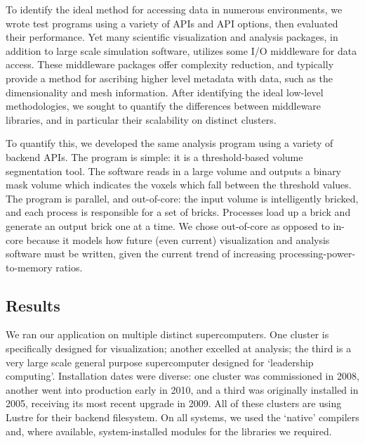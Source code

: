 To identify the ideal method for accessing data in numerous
environments, we wrote test programs using a variety of APIs and
API options, then evaluated their performance.  Yet many scientific
visualization and analysis packages, in addition to large scale
simulation software, utilizes some I/O middleware for data access.
These middleware packages offer complexity reduction, and typically
provide a method for ascribing higher level metadata with data, such as
the dimensionality and mesh information.  After identifying the ideal
low-level methodologies, we sought to quantify the differences between
middleware libraries, and in particular their scalability on distinct
clusters.

To quantify this, we developed the same analysis program using
a variety of backend APIs.  The program is simple: it is a
threshold-based volume segmentation tool.  The software reads in a
large volume and outputs a binary mask volume which indicates the
voxels which fall between the threshold values.  The program is
parallel, and out-of-core: the input volume is intelligently bricked,
and each process is responsible for a set of bricks.  Processes load
up a brick and generate an output brick one at a time.  We chose
out-of-core as opposed to in-core because it models how future (even
current) visualization and analysis software must be written, given the
current trend of increasing processing-power-to-memory ratios.


\subsection{Results}

We ran our application on multiple distinct supercomputers.  One
cluster is specifically designed for visualization; another excelled at
analysis; the third is a very large scale general purpose supercomputer
designed for `leadership computing'.  Installation dates were diverse:
one cluster was commissioned in 2008, another went into production
early in 2010, and a third was originally installed in 2005, receiving
its most recent upgrade in 2009.  All of these clusters are using
Lustre for their backend filesystem.  On all systems, we used the
`native' compilers and, where available, system-installed modules for
the libraries we required.


